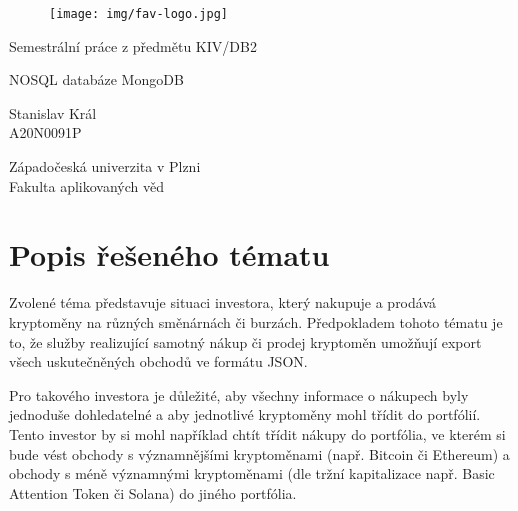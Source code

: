 \documentclass[12pt, a4paper]{article}
\let\oldsection\section
\renewcommand\section{\clearpage\oldsection}
\begin{document}
	\renewcommand{\lstlistingname}{Ukázka kódu}
	\renewcommand{\lstlistlistingname}{Seznam ukázek kódu}
    \begin{titlepage}

        \centering

        \vspace*{\baselineskip}
        \begin{figure}[H]
        \centering
        \texttt{[image: img/fav-logo.jpg]}
        \end{figure}

        \vspace*{1\baselineskip}

        \vspace{0.75\baselineskip}

        \vspace{0.5\baselineskip}
        {Semestrální práce z předmětu KIV/DB2}

        {\LARGE\sc NOSQL databáze MongoDB\\}

        \vspace{4\baselineskip}

        \vspace{0.5\baselineskip}

        {\sc\Large Stanislav Král \\}
        \vspace{0.5\baselineskip}
        {A20N0091P}

        \vfill

        {\sc Západočeská univerzita v Plzni\\
        Fakulta aplikovaných věd}

    \end{titlepage}


    \tableofcontents
    \pagebreak

    
\section{Popis řešeného tématu}
Zvolené téma představuje situaci investora, který nakupuje a prodává kryptoměny na různých směnárnách či burzách. Předpokladem tohoto tématu je to, že služby realizující samotný nákup či prodej kryptoměn umožňují export všech uskutečněných obchodů ve formátu JSON. 

Pro takového investora je důležité, aby všechny informace o nákupech byly jednoduše dohledatelné a aby jednotlivé kryptoměny mohl třídit do portfólií. Tento investor by si mohl například chtít třídit nákupy do portfólia, ve kterém si bude vést obchody s významnějšími kryptoměnami (např. Bitcoin či Ethereum) a obchody s méně významnými kryptoměnami (dle tržní kapitalizace např. Basic Attention Token či Solana) do jiného portfólia.
    
\end{document}
